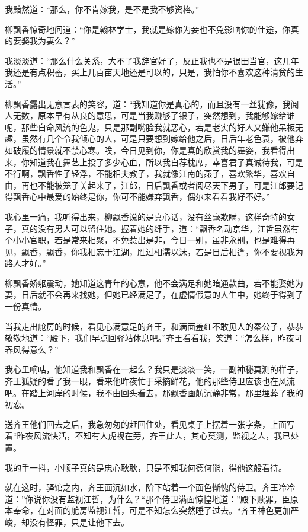 我黯然道：“那么，你不肯嫁我，是不是我不够资格。”

柳飘香惊奇地问道：“你是翰林学士，我就是嫁你为妾也不免影响你的仕途，你真的要娶我为妻么？”

我淡淡道：“那么什么关系，大不了我辞官好了，反正我也不是很田当官，这几年我还是有点积蓄，买上几百亩天地还是可以的，只是，我怕你不喜欢这种清贫的生活。”

柳飘香露出无意言表的笑容，道：“我知道你是真心的，而且没有一丝犹豫，我阅人无数，原本早有从良的意思，可是当我赚够了银子，突然想到，我能够嫁给谁呢，那些自命风流的色鬼，只是那副嘴脸我就恶心，若是老实的好人又嫌他呆板无趣，虽然有几个令我倾心的人，可是只要想到嫁给他之后，日后年老色衰，被他弃如破履的情景就不禁心寒。唉，今日见到你，你是真的欣赏我的舞姿，我看得出来，你知道我在舞艺上投了多少心血，所以我自荐枕席，幸喜君子真诚待我，可是不行啊，飘香性子轻浮，不能相夫教子，我就像江南的燕子，喜欢繁华，喜欢自由，再也不能被笼子关起来了，江郎，日后飘香或者阅尽天下男子，可是江郎要记得飘香心中最爱的始终是你，你可不能嫌弃飘香，偶尔来看看我好不好。”

我心里一痛，我听得出来，柳飘香说的是真心话，没有丝毫欺瞒，这样奇特的女子，真的没有男人可以留住她。握着她的纤手，道：“飘香名动京华，江哲虽然有个小小官职，若是常来相聚，不免惹出是非，今日一别，虽非永别，也是难得再见，飘香，飘香，你我相忘于江湖，胜过相濡以沫，若是日后相逢，你不要视我为路人才好。”

柳飘香娇躯震动，她知道这青年的心意，他不会满足和她暗通款曲，若不能娶她为妻，日后就不会再来找她，但她已经满足了，在虚情假意的人生中，她终于得到了一份真情。

当我走出舱房的时候，看见心满意足的齐王，和满面羞红不敢见人的秦公子，恭恭敬敬地道：“殿下，我们早点回驿站休息吧。”齐王看看我，笑道：“怎么样，昨夜可春风得意么？”

我心里嘀咕，他知道我和飘香在一起么？我只是淡淡一笑，一副神秘莫测的样子，齐王狐疑的看了我一眼，看来他昨夜忙于采摘鲜花，他的那些侍卫应该也在风流吧。在踏上河岸的时候，我不由回头看去，那飘香画舫沉静非常，那里埋葬了我的初恋。

送齐王他们回去之后，我急匆匆的赶回住处，看见桌子上摆着一张字条，上面写着“昨夜风流快活，不知有人虎视在旁，齐王此人，其心莫测，监视之人，我已处置。

我的手一抖，小顺子真的是忠心耿耿，只是不知我何德何能，得他这般看待。

就在这时，驿馆之内，齐王面沉如水，阶下站着一个面色惭愧的侍卫。齐王冷冷道：”你说你没有监视江哲，为什么？“那个侍卫满面惊惶地道：”殿下赎罪，臣原本奉命，在对面的舱房监视江哲，可是不知怎么突然睡了过去。“齐王神色更加严峻，却没有怪罪，只是让他下去。

